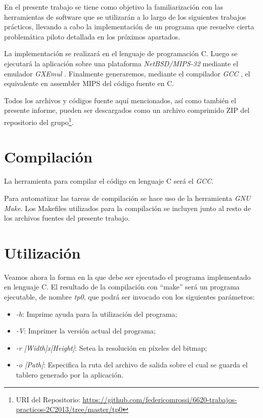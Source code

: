 \documentclass{article}
\begin{document}
	En el presente trabajo se tiene como objetivo la familiarización con las herramientas de software que se utilizarán a lo largo de los siguientes trabajos prácticos, llevando a cabo la implementación de un programa que resuelve cierta problemática piloto detallada en los próximos apartados.
	\par
	La implementación se realizará en el lenguaje de programación C. Luego se ejecutará la aplicación sobre una plataforma \textit{NetBSD/MIPS-32} mediante el emulador \textit{GXEmul} \cite{GXEMUL}. Finalmente generaremos, mediante el compilador \textit{GCC} \cite{GCC}, el equivalente en assembler MIPS del código fuente en C.
	\par
	Todos los archivos y códigos fuente aquí mencionados, así como también el presente informe, pueden ser descargados como un archivo comprimido ZIP del repositorio del grupo\footnote{URI del Repositorio: \url{https://github.com/federicomrossi/6620-trabajos-practicos-2C2013/tree/master/tp0}}.
\bigskip




\section{Compilación}
	
	La herramienta para compilar el código en lenguaje C será el \textit{GCC}.
	\par
	Para automatizar las tareas de compilación se hace uso de la herramienta \textit{GNU Make}. Los Makefiles utilizados para la compilación se incluyen junto al resto de los archivos fuentes del presente trabajo.
\bigskip




\section{Utilización}
	
	Veamos ahora la forma en la que debe ser ejecutado el programa implementado en lenguaje C. El resultado de la compilación con ``make'' será un programa ejecutable, de nombre \textit{tp0}, que podrá ser invocado con los siguientes parámetros:
\medskip

\begin{itemize}

\itemsep=2pt \topsep=0pt \partopsep=0pt \parskip=0pt \parsep=0pt
	\item \textit{-h}:  Imprime ayuda para la utilización del programa;
	\item \textit{-V}:  Imprimer la versión actual del programa;
	\item \textit{-r [Width]x[Height]}: Setea la resolución en píxeles del bitmap;
	\item \textit{-o [Path]}: Especifica la ruta del archivo de salida sobre el cual se guarda el tablero generado por la aplicación.

\end{itemize}
\medskip
\end{document}
